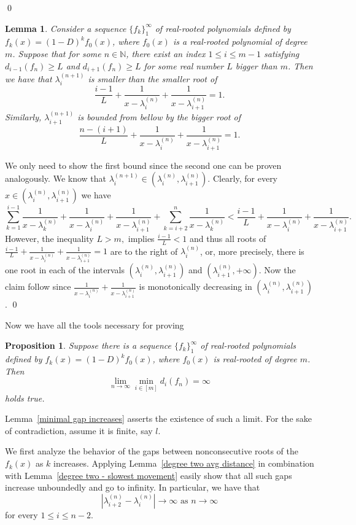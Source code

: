 \documentclass[11pt]{article}
\newtheorem{lemma}[theorem]{Lemma}
\newtheorem{proposition}[theorem]{Proposition}
\begin{document}
\qed

\begin{lemma}
\label{minimal gap shall approach}
 Consider a sequence $\{f_k\}_1^\infty$ of real-rooted polynomials defined by $f_k(x) = (1-D)^k f_0(x)$, where $f_0(x)$ is a real-rooted polynomial of degree~$m$. Suppose that for some $n\in\mathbb{N}$, there exist an index $1\leq i\leq m-1$ satisfying $d_{i-1}(f_n) \geq L$ and $d_{i+1}(f_n) \geq L$ for some real number $L$ bigger than $m$. Then we have that $\lambda^{(n+1)}_i$ is smaller than the smaller root of
 \[\frac{i-1}{L}+\frac{1}{x-\lambda^{(n)}_i} + \frac{1}{x-\lambda^{(n)}_{i+1}} = 1.\]
 Similarly, $\lambda^{(n+1)}_{i+1}$ is bounded from bellow by the bigger root of
 \[\frac{n-(i+1)}{L}+\frac{1}{x-\lambda^{(n)}_i} + \frac{1}{x-\lambda^{(n)}_{i+1}} = 1.\]
\end{lemma}
\proof
We only need to show the first bound since the second one can be proven analogously. We know that $\lambda^{(n+1)}_i\in(\lambda^{(n)}_i,\lambda^{(n)}_{i+1})$. Clearly, for every $x\in (\lambda^{(n)}_i,\lambda^{(n)}_{i+1})$ we have
\[\sum^{i-1}_{k=1} \frac{1}{x-\lambda^{(n)}_k} + \frac{1}{x-\lambda^{(n)}_i} + \frac{1}{x-\lambda^{(n)}_{i+1}} + \sum^n_{k = i+2} \frac{1}{x-\lambda^{(n)}_k} < \frac{i-1}{L}+\frac{1}{x-\lambda^{(n)}_i} + \frac{1}{x-\lambda^{(n)}_{i+1}}.\]
However, the inequality $L > m,$ implies $\frac{i-1}{L}<1$ and thus all roots of $\frac{i-1}{L}+\frac{1}{x-\lambda^{(n)}_i} + \frac{1}{x-\lambda^{(n)}_{i+1}} = 1$ are to the right of $\lambda^{(n)}_i$, or, more precisely, there is one root in each of the intervals $(\lambda^{(n)}_i,\lambda^{(n)}_{i+1})$ and $(\lambda^{(n)}_{i+1},+\infty)$. Now the claim follow since $\frac{1}{x-\lambda^{(n)}_i} + \frac{1}{x-\lambda^{(n)}_{i+1}}$ is monotonically decreasing in $(\lambda^{(n)}_i,\lambda^{(n)}_{i+1})$.
\qed

Now we have all the tools necessary for proving

\begin{proposition}
\label{minimal gap is unbounded}
Suppose there is a sequence $\{f_k\}_1^\infty$ of real-rooted polynomials defined by $f_k(x) = (1-D)^k f_0(x)$, where $f_0(x)$ is real-rooted of degree $m$. Then
\[\lim_{n\to\infty} \min_{i \in [m]} d_i (f_n) = \infty\]
holds true.
\end{proposition}
\proof Lemma~\ref{minimal gap increases} asserts the existence of such a limit. For the sake of contradiction, assume it is finite, say $l$.

We first analyze the behavior of the gaps between nonconsecutive roots of the $f_k(x)$ as $k$ increases. Applying Lemma~\ref{degree two avg distance} in combination with Lemma~\ref{degree two - slowest movement} easily show that all such gaps increase unboundedly and go to infinity. In particular, we have that
\[|\lambda^{(n)}_{i+2} - \lambda^{(n)}_i|\to \infty\text{~as~$n\to\infty$}\]
for every $1\leq i \leq n-2$.
\end{document}
